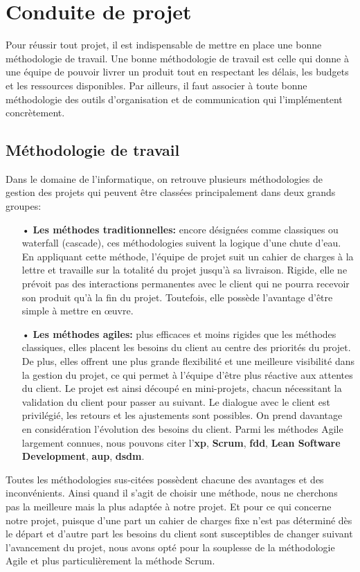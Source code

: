 \section{Conduite de projet}
Pour réussir tout projet, il est indispensable de mettre en place une bonne méthodologie de travail. Une bonne méthodologie de travail est celle qui donne à une équipe de pouvoir livrer un produit tout en respectant les délais, les budgets et les ressources disponibles. Par ailleurs, il faut associer à toute bonne méthodologie des outils d'organisation et de communication qui l'implémentent concrètement.
    \subsection{Méthodologie de travail}
    Dans le domaine de l’informatique, on retrouve plusieurs méthodologies de gestion des projets qui peuvent être classées principalement dans deux grands groupes:
        \begin{itemize}
            \item[•] \textbf{Les méthodes traditionnelles: }encore désignées comme classiques ou waterfall (cascade), ces méthodologies suivent la logique d’une chute d’eau. En appliquant cette méthode, l’équipe de projet suit un cahier de charges à la lettre et travaille sur la totalité du projet jusqu’à sa livraison. Rigide, elle ne prévoit pas des interactions permanentes avec le client qui ne pourra recevoir son produit qu’à la fin du projet. Toutefois, elle possède l’avantage d’être simple à mettre en œuvre.
            \item[•] \textbf{Les méthodes agiles: }plus efficaces et moins rigides que les méthodes classiques, elles placent les besoins du client au centre des priorités du projet. De plus, elles offrent une plus grande flexibilité et une meilleure visibilité dans la gestion du projet, ce qui permet à l'équipe d'être plus réactive aux attentes du client. Le projet est ainsi découpé en mini-projets, chacun nécessitant la validation du client pour passer au suivant. Le dialogue avec le client est privilégié, les retours et les ajustements sont possibles. On prend davantage en considération l'évolution des besoins du client. Parmi les méthodes Agile largement connues, nous pouvons citer l'\textbf{\acrfull{xp}},
            \textbf{Scrum}, \textbf{\acrfull{fdd}}, \textbf{Lean Software Development}, \textbf{\acrfull{aup}}, \textbf{\acrfull{dsdm}}.
        \end{itemize}

        Toutes les méthodologies sus-citées possèdent chacune des avantages et des inconvénients. Ainsi quand il s’agit de choisir une méthode, nous ne cherchons pas la meilleure mais la plus adaptée à notre projet. Et pour ce qui concerne notre projet, puisque d’une part un cahier de charges fixe n’est pas déterminé dès le départ et d’autre part les besoins du client sont susceptibles de changer suivant l’avancement du projet, nous avons opté pour la souplesse de la méthodologie Agile et plus particulièrement la méthode Scrum.
        
